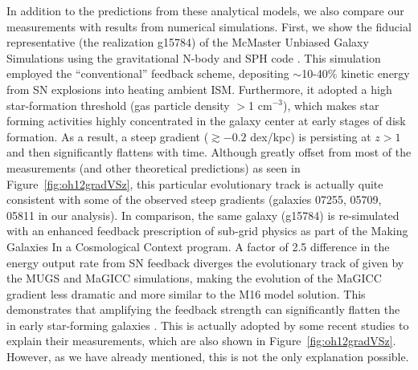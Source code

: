 In addition to the predictions from these analytical models, we also compare our measurements
with results from numerical simulations.  First, we show the fiducial representative (\ie the
realization g15784) of the McMaster Unbiased Galaxy Simulations
\citep[MUGS,][]{Stinson:2010ix} using the gravitational N-body and SPH code \gasoline.  This
simulation employed the ``conventional'' feedback scheme, \ie depositing $\sim$10-40\%
kinetic energy from SN explosions into heating ambient ISM. Furthermore, it adopted a high
star-formation threshold (gas particle density $>$1 cm$^{-3}$), which makes star forming
activities highly concentrated in the galaxy center at early stages of disk formation.  As a
result, a steep gradient (\ie $\gtrsim-0.2$ dex/kpc) is persisting at $z>1$ and then
significantly flattens with time.  Although greatly offset from most of the measurements (and
other theoretical predictions) as seen in Figure~\ref{fig:oh12gradVSz}, this particular
evolutionary track is actually quite consistent with some of the observed steep gradients
(galaxies 07255, 05709, 05811 in our analysis).  In comparison, the same galaxy (g15784) is
re-simulated with an enhanced feedback prescription of sub-grid physics as part of the Making
Galaxies In a Cosmological Context \citep[MaGICC,][]{Stinson:2013ex} program.  A factor of
2.5 difference in the energy output rate from SN feedback diverges the evolutionary track of
\mgs given by the MUGS and MaGICC simulations, making the evolution of the MaGICC gradient
less dramatic and more similar to the M16 model solution.  This demonstrates that amplifying
the feedback strength can significantly flatten the \mgs in early star-forming galaxies
\citep{Gibson:2013jw}.
This is actually adopted by some recent studies \citep{2015arXiv150901279L,2016ApJ...827...74W} to
explain their \mg measurements, which are also shown in Figure~\ref{fig:oh12gradVSz}.
However, as we have already mentioned, this is not the only explanation possible.

